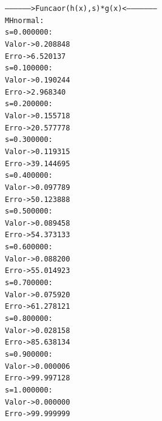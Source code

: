 \documentclass [a4paper,10pt]{article}
\begin{document}
\begin{alltt}
			\indent -----------------> Funcao r(h(x), s) * g(x)<---------------------
			\indent MH normal:
			\indent s = 0.000000:
					\hspace{10mm}Valor -> 0.208848
					\hspace{10mm}Erro -> 6.520137%
			\indent s = 0.100000:
					\hspace{10mm}Valor -> 0.190244
					\hspace{10mm}Erro -> 2.968340%
			\indent s = 0.200000:
					\hspace{10mm}Valor -> 0.155718
					\hspace{10mm}Erro -> 20.577778%
			\indent s = 0.300000:
					\hspace{10mm}Valor -> 0.119315
					\hspace{10mm}Erro -> 39.144695%
			\indent s = 0.400000:
					\hspace{10mm}Valor -> 0.097789
					\hspace{10mm}Erro -> 50.123888%
			\indent s = 0.500000:
					\hspace{10mm}Valor -> 0.089458
					\hspace{10mm}Erro -> 54.373133%
			\indent s = 0.600000:
					\hspace{10mm}Valor -> 0.088200
					\hspace{10mm}Erro -> 55.014923%
			\indent s = 0.700000:
					\hspace{10mm}Valor -> 0.075920
					\hspace{10mm}Erro -> 61.278121%
			\indent s = 0.800000:
					\hspace{10mm}Valor -> 0.028158
					\hspace{10mm}Erro -> 85.638134%
			\indent s = 0.900000:
					\hspace{10mm}Valor -> 0.000006
					\hspace{10mm}Erro -> 99.997128%
			\indent s = 1.000000:
					\hspace{10mm}Valor -> 0.000000
					\hspace{10mm}Erro -> 99.999999%
		\end{alltt}
\end{document}
